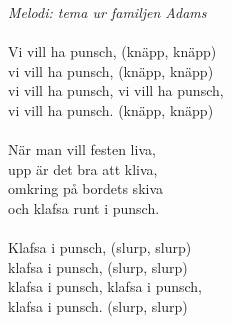 {\footnotesize\textit{Melodi: tema ur familjen Adams}}\\
\\
Vi vill ha punsch, (knäpp, knäpp)\\
vi vill ha punsch, (knäpp, knäpp)\\
vi vill ha punsch, vi vill ha punsch,\\
vi vill ha punsch. (knäpp, knäpp)\\
\\
När man vill festen liva,\\
upp är det bra att kliva,\\
omkring på bordets skiva\\
och klafsa runt i punsch.\\
\\
Klafsa i punsch, (slurp, slurp)\\
klafsa i punsch, (slurp, slurp)\\
klafsa i punsch, klafsa i punsch,\\
klafsa i punsch. (slurp, slurp)
